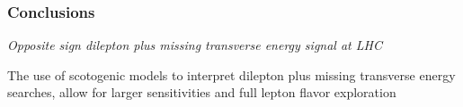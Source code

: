 \documentclass[%
xcolor=dvipsnames,table%
]{beamer}
\begin{document}
\begin{frame}
  \frametitle{Conclusions}
\emph{Opposite sign {\color{red}dilepton plus missing transverse energy } signal at LHC }

  The use of scotogenic models to interpret {\color{red}dilepton
plus missing transverse energy} searches, allow for larger sensitivities and 
full lepton flavor exploration
\end{frame}

\end{document}
